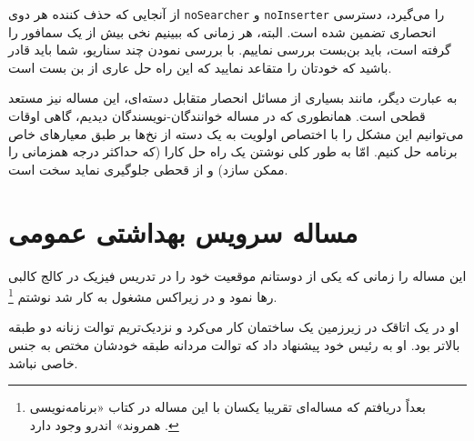 \documentclass{book}
\begin{document}
    از آنجایی که حذف کننده هر دوی  {\tt noSearcher} و {\tt noInserter} را می‌گیرد، دسترسی انحصاری تضمین شده است. 
    البته، هر زمانی که ببینیم نخی بیش از یک سمافور را گرفته است، باید بن‌بست بررسی نماییم. با بررسی نمودن چند سناریو، 
    شما باید قادر باشید که خودتان را متقاعد نمایید که این راه حل عاری از بن بست است. 

    به عبارت دیگر، مانند بسیاری از مسائل انحصار متقابل دسته‌ای، این مساله نیز مستعد قطحی است. 
    همانطوری که در مساله خوانندگان-نویسندگان دیدیم، گاهی اوقات می‌توانیم این مشکل را با اختصاص اولویت به یک دسته از نخ‌ها 
    بر طبق معیارهای خاص برنامه حل کنیم. 
    امّا به طور کلی نوشتن یک راه حل کارا (که حداکثر درجه همزمانی را ممکن سازد) و از قحطی جلوگیری نماید سخت است. 


\section{مساله سرویس بهداشتی عمومی}

    این مساله را زمانی که یکی از دوستانم موقعیت خود را در تدریس فیزیک در کالج کالبی رها نمود 
    و در زیراکس مشغول به کار شد نوشتم%
    \footnote{بعداً دریافتم که مساله‌ای تقریبا یکسان با این مساله در کتاب «برنامه‌نویسی همروند» اندرو وجود دارد \cite{andrews}.}. 

    او در یک اتاقک در زیرزمین یک ساختمان کار می‌کرد و نزدیک‌تریم توالت زنانه دو طبقه بالاتر بود.
    او به رئیس خود پیشنهاد داد که توالت مردانه طبقه خودشان مختص به جنس خاصی نباشد. 
\end{document}
